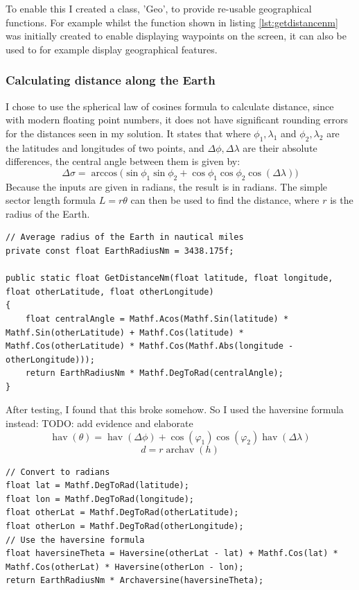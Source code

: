 \documentclass{article}
\begin{document}
To enable this I created a class, 'Geo', to provide re-usable geographical functions.
For example whilst the function shown in listing \ref{lst:getdistancenm} was initially created to enable displaying waypoints on the screen, it can also be used to for example display geographical features.

\subsubsection{Calculating distance along the Earth}
I chose to use the spherical law of cosines formula to calculate distance, since with modern floating point numbers, it does not have significant rounding errors for the distances seen in my solution.
It states that where $\phi _{1}, \lambda _{1}$ and $\phi _{2}, \lambda _{2}$ are the latitudes and longitudes of two points, and ${\Delta \phi, \Delta \lambda}$ are their absolute differences, the central angle between them is given by:
\[ \Delta \sigma =\arccos {\bigl (}\sin \phi _{1}\sin \phi _{2}+\cos \phi _{1}\cos \phi _{2}\cos(\Delta \lambda ){\bigr )} \] 
Because the inputs are given in radians, the result is in radians.
The simple sector length formula $L=r\theta$ can then be used to find the distance, where $r$ is the radius of the Earth\cite{greatcircledistance}.
\lstset{style=csharp}
\begin{lstlisting}[label={lst:getdistancenm},caption=Calculating great-circle distance using the spherical law of cosines]
// Average radius of the Earth in nautical miles
private const float EarthRadiusNm = 3438.175f;

public static float GetDistanceNm(float latitude, float longitude, float otherLatitude, float otherLongitude)
{
    float centralAngle = Mathf.Acos(Mathf.Sin(latitude) * Mathf.Sin(otherLatitude) + Mathf.Cos(latitude) * Mathf.Cos(otherLatitude) * Mathf.Cos(Mathf.Abs(longitude - otherLongitude)));
    return EarthRadiusNm * Mathf.DegToRad(centralAngle);
}
\end{lstlisting}

After testing, I found that this broke somehow.
So I used the haversine formula instead:
TODO: add evidence and elaborate
\[ \operatorname{hav}(\theta ) = \operatorname{hav} (\Delta \phi) + \cos(\varphi _{1})\cos (\varphi _{2})\operatorname{hav}(\Delta \lambda) \] 
\[ d = r \operatorname{archav} (h) \]

\begin{lstlisting}[label={lst:getdistancenmhaversine},caption=Calculating great-circle distance using the haversine formula]
// Convert to radians
float lat = Mathf.DegToRad(latitude);
float lon = Mathf.DegToRad(longitude);
float otherLat = Mathf.DegToRad(otherLatitude);
float otherLon = Mathf.DegToRad(otherLongitude);
// Use the haversine formula
float haversineTheta = Haversine(otherLat - lat) + Mathf.Cos(lat) * Mathf.Cos(otherLat) * Haversine(otherLon - lon);
return EarthRadiusNm * Archaversine(haversineTheta);
\end{lstlisting}
\end{document}
